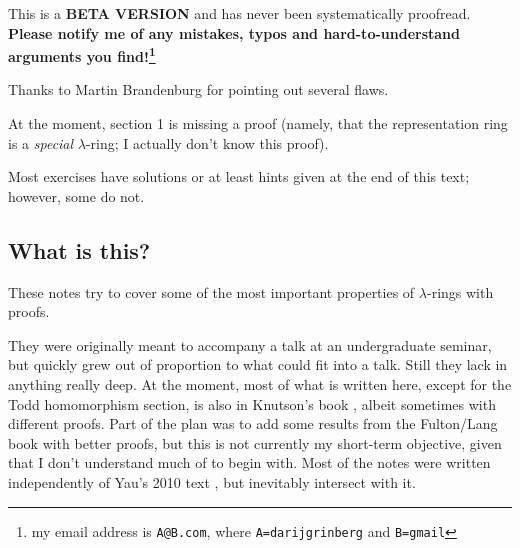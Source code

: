 \documentclass[numbers=enddot,12pt,final,onecolumn,notitlepage]{scrartcl}%
\begin{document}
\title{}
\author{Darij Grinberg}
\date{Version 0.0.21, last revised
\today
}
\maketitle
\tableofcontents



\bigskip

This is a \textbf{BETA VERSION} and has never been systematically proofread.
\textbf{Please notify me of any mistakes, typos and hard-to-understand
arguments you find!\footnote{my email address is \texttt{A@B.com}, where
\texttt{A=darijgrinberg} and \texttt{B=gmail}}}

Thanks to Martin Brandenburg for pointing out several flaws.

At the moment, section 1 is missing a proof (namely, that the representation
ring is a \textit{special} $\lambda$-ring; I actually don't know this proof).

Most exercises have solutions or at least hints given at the end of this text;
however, some do not.

\bigskip

\subsection*{What is this?}

These notes try to cover some of the most important properties of $\lambda
$-rings with proofs.

They were originally meant to accompany a talk at an undergraduate seminar,
but quickly grew out of proportion to what could fit into a talk. Still they
lack in anything really deep. At the moment, most of what is written here,
except for the Todd homomorphism section, is also in Knutson's book
\cite{Knut73}, albeit sometimes with different proofs. Part of the plan was to
add some results from the Fulton/Lang book \cite{FulLan85} with better proofs,
but this is not currently my short-term objective, given that I don't
understand much of \cite{FulLan85} to begin with. Most of the notes were
written independently of Yau's 2010 text \cite{Yau10}, but inevitably
intersect with it.
\end{document}

